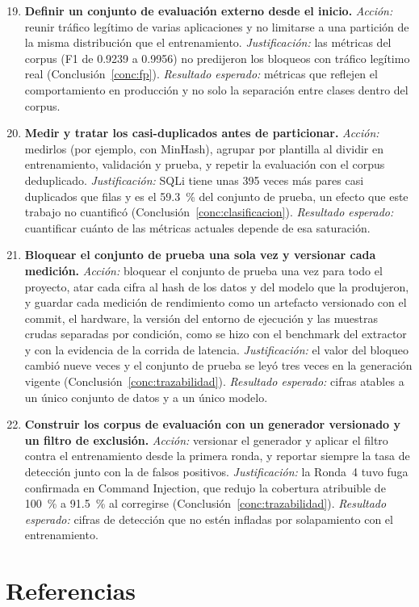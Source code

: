 \begin{enumerate}
    \setcounter{enumi}{18}
    \item \textbf{Definir un conjunto de evaluación externo desde el inicio.} \textit{Acción:}
    reunir tráfico legítimo de varias aplicaciones y no limitarse a una partición de la misma
    distribución que el entrenamiento. \textit{Justificación:} las métricas del corpus (F1 de
    0.9239 a 0.9956) no predijeron los bloqueos con tráfico legítimo real (Conclusión~\ref{conc:fp}).
    \textit{Resultado esperado:} métricas que reflejen el comportamiento en producción y no solo la
    separación entre clases dentro del corpus.

    \item \textbf{Medir y tratar los casi-duplicados antes de particionar.} \textit{Acción:}
    medirlos (por ejemplo, con MinHash), agrupar por plantilla al dividir en entrenamiento,
    validación y prueba, y repetir la evaluación con el corpus deduplicado. \textit{Justificación:}
    SQLi tiene unas 395 veces más pares casi duplicados que filas y es el 59.3~\% del conjunto de
    prueba, un efecto que este trabajo no cuantificó (Conclusión~\ref{conc:clasificacion}).
    \textit{Resultado esperado:} cuantificar cuánto de las métricas actuales depende de esa
    saturación.

    \item \textbf{Bloquear el conjunto de prueba una sola vez y versionar cada medición.}
    \textit{Acción:} bloquear el conjunto de prueba una vez para todo el proyecto, atar cada cifra
    al hash de los datos y del modelo que la produjeron, y guardar cada medición de rendimiento
    como un artefacto versionado con el commit, el hardware, la versión del entorno de ejecución y
    las muestras crudas separadas por condición, como se hizo con el benchmark del extractor y con
    la evidencia de la corrida de latencia. \textit{Justificación:} el valor del bloqueo cambió
    nueve veces y el conjunto de prueba se leyó tres veces en la generación vigente
    (Conclusión~\ref{conc:trazabilidad}). \textit{Resultado esperado:} cifras atables a un único
    conjunto de datos y a un único modelo.

    \item \textbf{Construir los corpus de evaluación con un generador versionado y un filtro de
    exclusión.} \textit{Acción:} versionar el generador y aplicar el filtro contra el
    entrenamiento desde la primera ronda, y reportar siempre la tasa de detección junto con la de
    falsos positivos. \textit{Justificación:} la Ronda~4 tuvo fuga confirmada en Command Injection,
    que redujo la cobertura atribuible de 100~\% a 91.5~\% al corregirse
    (Conclusión~\ref{conc:trazabilidad}). \textit{Resultado esperado:} cifras de detección que no
    estén infladas por solapamiento con el entrenamiento.
\end{enumerate}

\ifdefined\modoensamble
\else
	\section*{Referencias}
	\printbibliography[heading=none]
	
\fi
